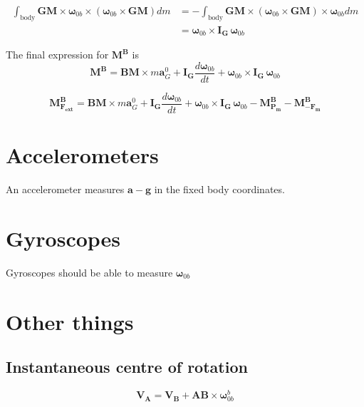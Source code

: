 \documentclass{article}
\begin{document}
\begin{equation}
\begin{array}{ll}
 \int_{\text{body}} \mathbf{GM}\times  \mathbf{ \omega}_{0b} \times (\mathbf{\omega}_{0b} \times \mathbf{GM} ) dm  &= -  \int_{\text{body}} \mathbf{GM}\times  (\mathbf{ \omega}_{0b} \times  \mathbf{GM} )  \times \mathbf{\omega}_{0b} dm  \\
 &= \mathbf{\omega}_{0b} \times \mathbf{I_G} \,  \mathbf{\omega}_{0b}
\end{array}
\end{equation}

The final expression for $ \mathbf{M^B}$ is
 \begin{equation}
 \mathbf{M^B} =\mathbf{BM}\times m \mathbf{a}^0_{G} + \mathbf{I_G} \frac{d \mathbf{ \omega}_{0b}}{dt} +   \mathbf{\omega}_{0b} \times \mathbf{I_G} \,  \mathbf{\omega}_{0b} 
\end{equation}



 \begin{equation}
\mathbf{M^B_{F_{ext}}} = \mathbf{BM}\times m \mathbf{a}^0_{G} + \mathbf{I_G} \frac{d \mathbf{ \omega}_{0b}}{dt} +   \mathbf{\omega}_{0b} \times \mathbf{I_G} \,  \mathbf{\omega}_{0b}  - \mathbf{M^B_{P_m}} - \mathbf{M^B_{-F_{m}}}  
\end{equation}

\section{Accelerometers}
An accelerometer measures $\mathbf{a} -\mathbf{g}$ in the fixed body coordinates. 

\section{Gyroscopes}
Gyroscopes should be able to measure $\mathbf{ \omega}_{0b}$


\section{Other things}
\subsection{Instantaneous centre of rotation}

\begin{equation}
\mathbf{V_A} =\mathbf{V_B} + \mathbf{A B} \times  \mathbf{\omega}_{0b}^b
\end{equation}
\end{document}
